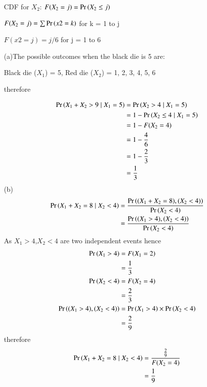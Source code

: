\documentclass[journal,12pt,twocolumn]{IEEEtran}
\begin{document}
CDF for $X_2$:
$F(X_2 = j) = \Pr\left(X_2 \le j\right)$

$F(X_2 = j) = \sum \Pr\left(x2 = k\right)$ for k = 1 to j

$F(x2 = j) = j/6$ for j = 1 to 6

(a)The possible outcomes when the black die is 5 are:

Black die ($X_1$) = 5, Red die ($X_2$) = 1, 2, 3, 4, 5, 6

therefore

\begin{align}
\Pr\left(X_1+X_2>9 \mid X_1=5\right)&=\Pr\left(X_2>4 \mid X_1=5\right)\\
&=1 - \Pr\left(X_2 \le 4 \mid X_1 = 5\right)\\
&=1-F(X_2 = 4)\\
&=1-\frac{4}{6}\\
&=1-\frac{2}{3}\\
&=\frac{1}{3}
\end{align}
(b)
\begin{align}
\Pr\left(X_1+X_2=8 \mid X_2<4\right)&=\frac{\Pr\left((X_1+X_2=8),(X_2<4)\right)}{\Pr\left(X_2<4\right)}\\
&=\frac{\Pr\left((X_1>4),(X_2<4)\right)}{\Pr\left(X_2<4\right)}
\end{align}
As $X_1>4$,$X_2<4$ are two independent events hence 
\begin{align}
\Pr\left(X_1>4\right)&=F(X_1=2)\\
&=\frac{1}{3}\\
\Pr\left(X_2<4\right)&=F(X_2=4)\\
&=\frac{2}{3}\\
\Pr\left((X_1>4),(X_2<4)\right)&=\Pr\left(X_1>4\right) \times \Pr\left(X_2<4\right)\\
&=\frac{2}{9}
\end{align}
therefore
\begin{align}
\Pr\left(X_1+X_2=8 \mid X_2<4\right)&=\frac{\frac{2}{9}}{F(X_2=4)}\\
&=\frac{1}{9}
\end{align}
\end{document}
